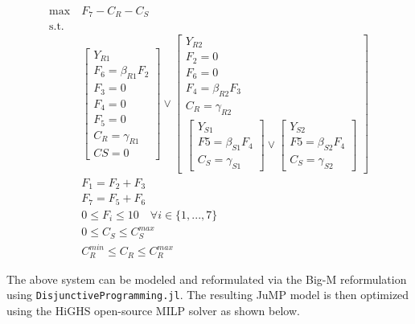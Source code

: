 \documentclass{juliacon}
\begin{document}
\begin{align*}
    \max \ &  F_7 - C_R - C_S \\
    \text{s.t.} \ & \\
    &\begin{bmatrix}
        Y_{R1} \\
        F_6 = \beta_{R1} F_2 \\
        F_3 = 0 \\
        F_4 = 0 \\
        F_5 = 0 \\
        C_R = \gamma_{R1} \\
        CS = 0
    \end{bmatrix} \lor
    \begin{bmatrix}
        Y_{R2} \\
        F_2 = 0 \\
        F_6 = 0 \\
        F_4 = \beta_{R2} F_3 \\
        C_R = \gamma_{R2} \\
        \begin{bmatrix}
            Y_{S1} \\
            F5 = \beta_{S1} F_4 \\
            C_S = \gamma_{S1}
        \end{bmatrix} \lor
        \begin{bmatrix}
            Y_{S2} \\
            F5 = \beta_{S2} F_4 \\
            C_S = \gamma_{S2}
        \end{bmatrix}
    \end{bmatrix} \\
    & F_1 = F_2 + F_3 \\
    & F_7 = F_5 + F_6 \\
    & 0 \leq F_i \leq 10 \quad \forall i \in \{1,...,7\} \\
    & 0 \leq C_S \leq C_S^{max} \\
    & C_R^{min} \leq C_R \leq C_R^{max}
\end{align*}

The above system can be modeled and reformulated via the Big-M reformulation using \verb|DisjunctiveProgramming.jl|. The resulting JuMP model is then optimized using the HiGHS open-source MILP solver \cite{huangfu2018parallelizing} as shown below.
\end{document}
